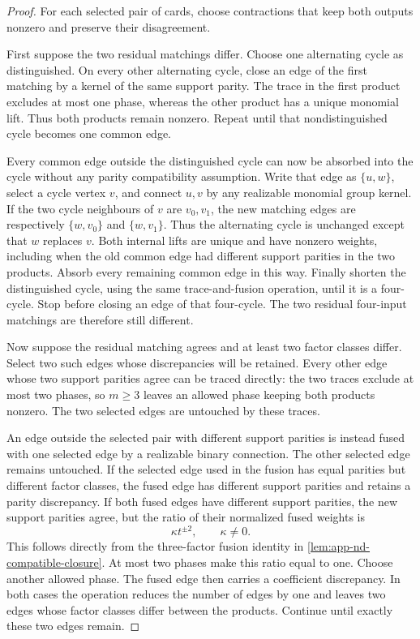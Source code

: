 \documentclass[11pt,letterpaper,onecolumn]{article}
\theoremstyle{plain}
\theoremstyle{definition}
\theoremstyle{remark}
\begin{document}
\begin{proof}
For each selected pair of cards, choose contractions that keep both
outputs nonzero and preserve their disagreement.

First suppose the two residual matchings differ.  Choose one alternating
cycle as distinguished.  On every other alternating cycle, close an edge
of the first matching by a kernel of the same support parity.  The trace
in the first product excludes at most one phase, whereas the other
product has a unique monomial lift.  Thus both products remain nonzero.
Repeat until that nondistinguished cycle becomes one common edge.

Every common edge outside the distinguished cycle can now be absorbed
into the cycle without any parity compatibility assumption.  Write that
edge as \(\{u,w\}\), select a cycle vertex \(v\), and connect
\(u,v\) by any realizable monomial group kernel.  If the two cycle neighbours
of \(v\) are \(v_0,v_1\), the new matching edges are respectively
\(\{w,v_0\}\) and \(\{w,v_1\}\).  Thus the alternating cycle is
unchanged except that \(w\) replaces \(v\).  Both internal lifts are
unique and have nonzero weights, including when the old common edge had
different support parities in the two products.  Absorb every remaining
common edge in this way.  Finally shorten the distinguished cycle, using
the same trace-and-fusion operation, until it is a four-cycle.  Stop
before closing an edge of that four-cycle.  The two residual four-input
matchings are therefore still different.

Now suppose the residual matching agrees and at least two factor classes
differ.  Select two such edges whose discrepancies will be retained.  Every other edge whose two support
parities agree can be traced directly: the two traces exclude at most
two phases, so \(m\ge3\) leaves an allowed phase keeping both products nonzero.  The two selected edges are untouched by these traces.

An edge outside the selected pair with different support parities is instead
fused with one selected edge by a realizable binary connection.  The other selected edge remains
untouched.  If the selected edge used in the fusion has equal parities but different
factor classes, the fused edge has different support parities and
retains a parity discrepancy.  If both fused edges have different support parities, the
new support parities agree, but the ratio of their normalized fused
weights is
\[
  \kappa t^{\pm2},\qquad \kappa\ne0.
\]
This follows directly from the three-factor fusion identity in
\cref{lem:app-nd-compatible-closure}.  At most two phases make this ratio
equal to one.  Choose another allowed phase. The fused edge then carries a
coefficient discrepancy.  In both cases the operation reduces the number of edges
by one and leaves two edges whose factor classes differ between the products.  Continue until
exactly these two edges remain.


\end{proof}
\end{document}
